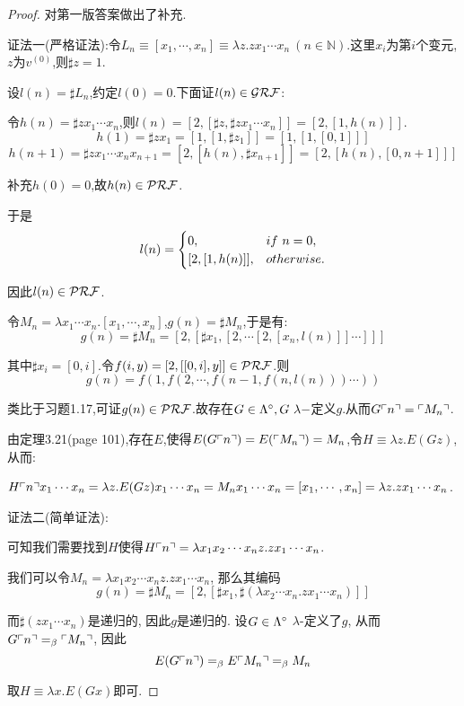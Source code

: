 \begin{proof}
{\color {red} {对第一版答案做出了补充.}}
    
    证法一(严格证法):令$L_n\equiv[x_1,\cdots,x_n]\equiv\lambda z.z x_1\cdots x_n \ (n \in \mathbb{N})$.这里$x_i$为第$i$个变元,$z$为$v^{(0)}$,则$\sharp z = 1$.
    
    设$l(n)=\sharp L_n$,约定$l(0)=0$.下面证$l(n) \in \mathcal{GRF}$:
    
    令$h(n)=\sharp z x_1 \cdots x_n$,则$l(n)=[2,[\sharp z, \sharp z x_1 \cdots x_n]]=[2,[1,h(n)]]$.
    $$h(1)=\sharp z x_1 = [1,[1,\sharp z_1]] = [1,[1,[0,1]]]$$
    $$h(n+1)=\sharp z x_1 \cdots x_n x_{n+1}=[2,[h(n),\sharp x_{n+1}]]=[2,[h(n),[0,n+1]]]$$
    
    补充$h(0)=0$,故$h(n)\in \mathcal{PRF}$.
    
    于是$$l(n)=\protect\begin{cases}
    0, & if\ n=0,\\
    [2,[1,h(n)]], & otherwise.
\protect\end{cases}$$

    因此$l(n) \in \mathcal{PRF}$.
    
    令$M_n= \lambda x_1 \cdots x_n.[x_1, \cdots, x_n]$,$g(n)=\sharp M_n$,于是有:
    $$g(n)=\sharp M_n=[2,[\sharp x_1,[2,\cdots[2,[x_n,l(n)]]\cdots]]]$$
    
    其中$\sharp x_i = [0,i]$.令$f(i,y)=[2,[[0,i],y]] \in \mathcal{PRF}$.则$$g(n)=f(1,f(2,\cdots,f(n-1,f(n,l(n)))\cdots))$$
    
    类比于习题1.17,可证$g(n)\in \mathcal{PRF}$.故存在$G \in \Lambdaclosed, G\ \lambda-$定义$g$.从而$G\ulcorner{n}\urcorner=\ulcorner{M_n}\urcorner$.
    
    由定理3.21(page 101),存在$E$,使得$E(G\ulcorner{n}\urcorner)=E(\ulcorner{M_n}\urcorner)=M_n$,令$H\equiv\lambda z.E(Gz)$,从而:
    
    $H\ulcorner{n}\urcorner x_1\cdots x_n = \lambda z.E(Gz)x_1\cdots x_n=M_n x_1 \cdots x_n=[x_1, \cdots, x_n]=\lambda z.z x_1 \cdots x_n$.
    
    \hspace*{\fill}
    
    证法二(简单证法):
    
    可知我们需要找到$H$使得$H\ulcorner{n}\urcorner=\lambda x_1x_2\cdots x_nz. zx_1\cdots x_n$.
    
    我们可以令$M_n=\lambda x_1x_2\cdots x_nz. zx_1\cdots x_n$, 那么其编码
    $$g(n)=\sharp M_n=[2,[\sharp x_1, \sharp (\lambda x_2\cdots x_n.zx_1\cdots x_n)]]$$
    
    而$\sharp (zx_1\cdots x_n)$是递归的, 因此$g$是递归的. 设$G\in\Lambda^\circ$ $\lambda$-定义了$g$, 从而$G\ulcorner{n}\urcorner=_{\beta}\ulcorner{M_n}\urcorner$, 因此
    $$E(G\ulcorner{n}\urcorner)=_{\beta} E\ulcorner{M_n}\urcorner=_{\beta} M_n$$
    
    取$H\equiv \lambda x.E(Gx)$即可.
    
    
    
\end{proof}